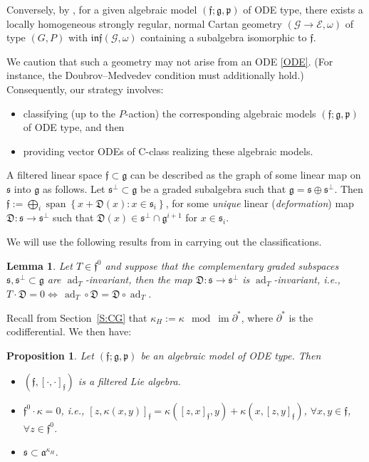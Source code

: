 \documentclass[pdftex]{sigma}%
\DeclareMathOperator{\img}{im}
\DeclareMathOperator{\sn}{span}
\newcommand\fD{\mathfrak{D}}
\newcommand{\g}{\mathfrak{g}}
\newcommand\ad{\operatorname{ad}}
\newcommand\cG{\mathcal{G}}
\newcommand\fa{\mathfrak{a}}
\newcommand\ff{\mathfrak{f}}
\newcommand\finf{\mathfrak{inf}}
\newcommand\fp{\mathfrak{p}}
\newcommand\fs{\mathfrak{s}}
\newcommand\cE{\mathcal{E}}
\numberwithin{equation}{section}
\newtheorem{Lemma}[Theorem]{Lemma}
\newtheorem{Proposition}[Theorem]{Proposition}
 { \theoremstyle{definition}
\newtheorem{Definition}[Theorem]{Definition}
\newtheorem{Note}[Theorem]{Note}
\newtheorem{Example}[Theorem]{Example}
\newtheorem{Remark}[Theorem]{Remark} }
\begin{document}
\begin{Remark}\label{R:Strategy}
 Conversely, by \cite[Lemma~4.1.4]{KT2017}, for a given algebraic model $(\ff; \g, \fp)$ of ODE type, there exists a locally homogeneous strongly regular, normal Cartan geometry $(\cG \to \cE, \omega)$ of type $(G,P)$ with $\finf(\cG, \omega)$ containing a subalgebra isomorphic to $\ff$.

 We caution that such a geometry may not arise from an ODE \eqref{ODE}. (For instance, the Doubrov--Medvedev condition must additionally hold.) Consequently, our strategy involves:
\begin{itemize}\itemsep=0pt
\item[(i)] classifying (up to the $P$-action) the corresponding algebraic models $(\ff;\g,\fp)$ of ODE type, and then
\item[(ii)] providing vector ODEs of C-class realizing these algebraic models.
\end{itemize}
\end{Remark}

A filtered linear space $\ff \subset \g$ can be described as the graph of some linear map on $\fs$ into $\g$ as follows. Let $\fs^\perp \subset \g$ be a graded subalgebra such that $\g = \fs \oplus \fs^\perp$. Then
$\ff := \bigoplus_i \sn\left\{ x + \fD(x) : x \in \fs_i \right\}$,
for some {\em unique} linear ({\em deformation}) map $\fD : \fs \to \fs^\perp$ such that $\fD(x) \in \fs^\perp \cap \g^{i+1}$ for $x \in \fs_i$.


We will use the following results from \cite[Section~A.1]{KT2021} in carrying out the classifications.

\begin{Lemma} \label{L:f0}
Let $T \in \ff^0$ and suppose that the complementary graded subspaces $\fs, \fs^\perp \subset \g$ are $\ad_T$-invariant, then the map $\fD\colon \fs \to \fs^\perp$ is $\ad_T$-invariant, i.e., $T\cdot \fD = 0 \iff \, \ad_T \circ \fD = \fD \circ \ad_T$.
\end{Lemma}

Recall from Section~\ref{S:CG} that $\kappa_H := \kappa \mod \img \partial^*$, where $\partial^*$ is the codifferential. We then have:
\begin{Proposition} \label{P:AM}
Let $(\ff; \g, \fp)$ be an algebraic model of ODE type. Then
\begin{itemize}\itemsep=0pt
\item [$(i)$] $(\ff, [\cdot,\cdot]_\ff)$ is a filtered Lie algebra.
\item [$(ii)$] $\ff^0 \cdot \kappa = 0$, i.e., $[z,\kappa(x,y)]_\ff = \kappa([z,x]_\ff,y) + \kappa(x,[z,y]_\ff)$, $\forall x,y \in \ff$, $\forall z \in \ff^0$.
\item [$(iii)$] $\fs \subset \fa^{\kappa_H}$.
\end{itemize}
\end{Proposition}
\end{document}
